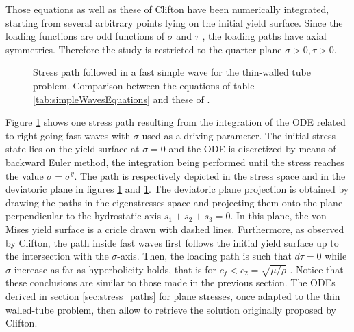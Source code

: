 Those equations as well as these of Clifton \cite{Clifton} have been numerically integrated, starting from several arbitrary points lying on the initial yield surface.
Since the loading functions are odd functions of $\sigma$ and $\tau$ \cite{Clifton}, the loading paths have axial symmetries.
Therefore the study is restricted to the quarter-plane $\sigma>0,\tau>0$.
\begin{figure}[h!]
  \centering
   \qquad
  \caption{Stress path followed in a fast simple wave for the thin-walled tube problem. Comparison between the equations of table \ref{tab:simpleWavesEquations} and these of \cite{Clifton}.}
  \label{fig:fast_clifton}
\end{figure}
Figure \ref{fig:fast_clifton} shows one stress path resulting from the integration of the ODE related to right-going fast waves with $\sigma$ used as a driving parameter.
The initial stress state lies on the yield surface at $\sigma=0$ and the ODE is discretized by means of backward Euler method, the integration being performed until the stress reaches the value $\sigma=\sigma^y$.
The path is respectively depicted in the stress space and in the deviatoric plane in figures \ref{fig:fast_clifton} and \ref{fig:fast_clifton}.
The deviatoric plane projection is obtained by drawing the paths in the eigenstresses space and projecting them onto the plane perpendicular to the hydrostatic axis $s_1+s_2+s_3=0$.
In this plane, the von-Mises yield surface is a cricle drawn with dashed lines.
Furthermore, as observed by Clifton, the path inside fast waves first follows the initial yield surface up to the intersection with the $\sigma$-axis.
Then, the loading path is such that $d\tau=0$ while $\sigma$ increase as far as hyperbolicity holds, that is for $c_f < c_2 = \sqrt{\mu/\rho} $ \cite{Clifton}.
Notice that these conclusions are similar to those made in the previous section.
The ODEs derived in section \ref{sec:stress_paths} for plane stresses, once adapted to the thin walled-tube problem, then allow to retrieve the solution originally proposed by Clifton.

